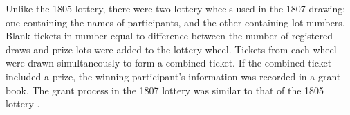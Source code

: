 Unlike the 1805 lottery, there were two lottery wheels used in the 1807 drawing: one containing the names of participants, and the other containing lot numbers. Blank tickets in number equal to difference between the number of registered draws and prize lots were added to the lottery wheel. Tickets from each wheel were drawn simultaneously to form a combined ticket. If the combined ticket included a prize, the winning participant's information was recorded in a grant book. The grant process in the 1807 lottery was similar to that of the 1805 lottery \citep{graham2011}. 
%
%
%
%
